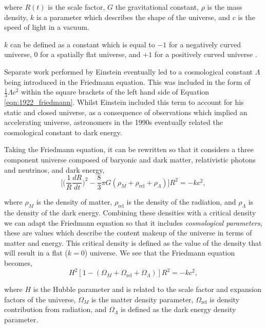 \documentclass[twocolumn]{revtex4}
\begin{document}
where $R(t)$ is the scale factor, $G$ the gravitational constant, $\rho$ is the mass density, $k$ is a parameter which describes the shape of the universe, and $c$ is the speed of light in a vacuum.

$k$ can be defined as a constant which is equal to $-1$ for a negatively curved universe, $0$ for a spatially flat universe, and $+1$ for a positively curved universe \cite{longair}. 

Separate work performed by Einstein eventually led to a cosmological constant $\Lambda$ being introduced in the Friedmann equation. This was included in the form of $\tfrac{1}{3}\Lambda c^2$ within the square brackets of the left hand side of Equation \ref{eqn:1922_friedmann}. Whilst Einstein included this term to account for his static and closed universe, as a consequence of observations which implied an accelerating universe, astronomers in the 1990s eventually related the cosmological constant to dark energy.

Taking the Friedmann equation, it can be rewritten so that it considers a three component universe composed of baryonic and dark matter, relativistic photons and neutrinos, and dark energy, 
\begin{equation}
\Big[ \Big( \frac{1}{R} \frac{dR}{dt} \Big)^2 - \frac{8}{3} \pi G (\rho_{M} + \rho_{\text{rel}} + \rho_{\Lambda} )\Big] R^2 = -kc^2,
\end{equation}

where $\rho_{M}$ is the density of matter, $\rho_{\text{rel}}$ is the density of the radiation, and $\rho_{\Lambda}$ is the density of the dark energy. Combining these densities with a critical density we can adapt the Friedmann equation so that it includes \textit{cosmological parameters}, these are values which describe the content makeup of the universe in terms of matter and energy. This critical density is defined as the value of the density that will result in a flat ($k=0$) universe. We see that the Friedmann equation becomes,
\begin{equation}
H^2 [1-(\Omega_{M} + \Omega_{\text{rel}} + \Omega_{\Lambda})]R^2 = -kc^2,
\label{eqn:friedmann_old}
\end{equation}

where $H$ is the Hubble parameter and is related to the scale factor and expansion factors of the universe, $\Omega_{M}$ is the matter density parameter, $\Omega_{\text{rel}}$ is density contribution from radiation, and $\Omega_{\Lambda}$ is defined as the dark energy density parameter.
\end{document}
